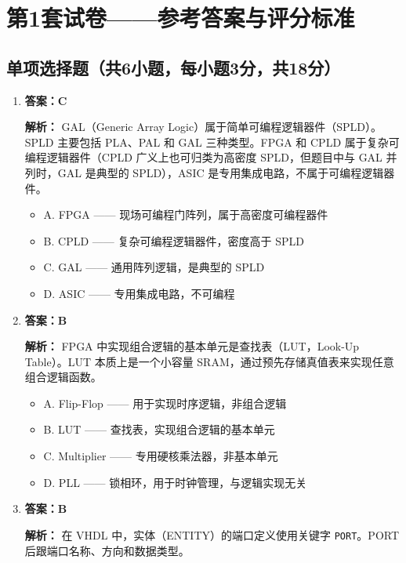 \chapter{第1套试卷——参考答案与评分标准}

\section{单项选择题（共6小题，每小题3分，共18分）}

\begin{enumerate}[label=\arabic*.]
\item \textbf{答案：C}

\textbf{解析：} GAL（Generic Array Logic）属于简单可编程逻辑器件（SPLD）。SPLD 主要包括 PLA、PAL 和 GAL 三种类型。FPGA 和 CPLD 属于复杂可编程逻辑器件（CPLD 广义上也可归类为高密度 SPLD，但题目中与 GAL 并列时，GAL 是典型的 SPLD），ASIC 是专用集成电路，不属于可编程逻辑器件。

\begin{itemize}
    \item A. FPGA —— 现场可编程门阵列，属于高密度可编程器件
    \item B. CPLD —— 复杂可编程逻辑器件，密度高于 SPLD
    \item C. GAL —— 通用阵列逻辑，是典型的 SPLD \quad \checkmark
    \item D. ASIC —— 专用集成电路，不可编程
\end{itemize}

\item \textbf{答案：B}

\textbf{解析：} FPGA 中实现组合逻辑的基本单元是查找表（LUT，Look-Up Table）。LUT 本质上是一个小容量 SRAM，通过预先存储真值表来实现任意组合逻辑函数。

\begin{itemize}
    \item A. Flip-Flop —— 用于实现时序逻辑，非组合逻辑
    \item B. LUT —— 查找表，实现组合逻辑的基本单元 \quad \checkmark
    \item C. Multiplier —— 专用硬核乘法器，非基本单元
    \item D. PLL —— 锁相环，用于时钟管理，与逻辑实现无关
\end{itemize}

\item \textbf{答案：B}

\textbf{解析：} 在 VHDL 中，实体（ENTITY）的端口定义使用关键字 \texttt{PORT}。PORT 后跟端口名称、方向和数据类型。


\end{enumerate}
